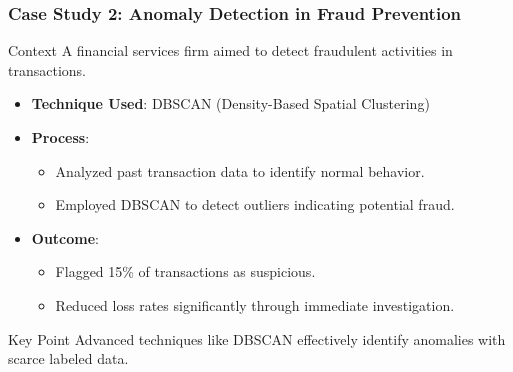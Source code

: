 \documentclass[aspectratio=169]{beamer}
\begin{document}
\begin{frame}[fragile]
    \frametitle{Case Study 2: Anomaly Detection in Fraud Prevention}

    \begin{block}{Context}
        A financial services firm aimed to detect fraudulent activities in transactions.
    \end{block}
    
    \begin{itemize}
        \item \textbf{Technique Used}: DBSCAN (Density-Based Spatial Clustering)
        \item \textbf{Process}:
        \begin{itemize}
            \item Analyzed past transaction data to identify normal behavior.
            \item Employed DBSCAN to detect outliers indicating potential fraud.
        \end{itemize}
        \item \textbf{Outcome}:
        \begin{itemize}
            \item Flagged 15\% of transactions as suspicious.
            \item Reduced loss rates significantly through immediate investigation.
        \end{itemize}
    \end{itemize}

    \begin{block}{Key Point}
        Advanced techniques like DBSCAN effectively identify anomalies with scarce labeled data.
    \end{block}
\end{frame}
\end{document}
